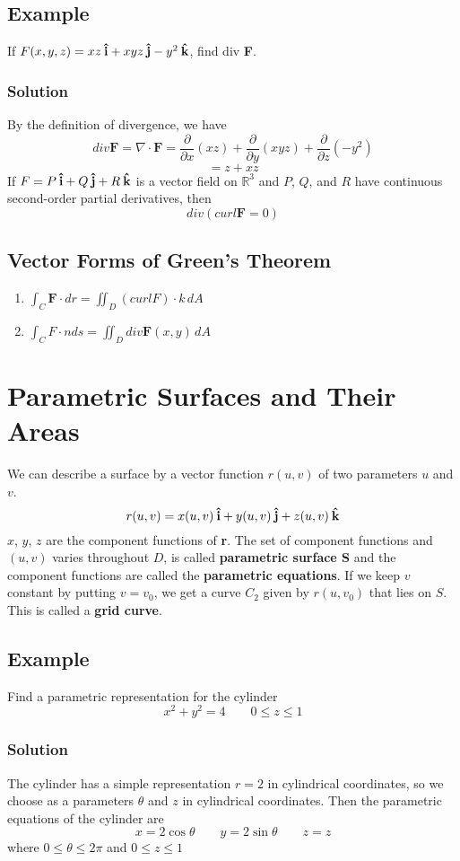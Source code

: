 \subsection*{Example}
If $F(x,y,z) = xz\:\boldsymbol{\hat{\textbf{i}}} + xyz\:\boldsymbol{\hat{\textbf{j}}} - y^2\:\boldsymbol{\hat{\textbf{k}}}$, find div \textbf{F}.
\subsubsection*{Solution} By the definition of divergence, we have 
$$div \textbf{F} = \nabla\cdot\textbf{F} = \frac{\partial}{\partial x}(xz) + \frac{\partial}{\partial y}(xyz) + \frac{\partial}{\partial z}(-y^2)$$
$$= z+ xz$$
If $F = P\:\boldsymbol{\hat{\textbf{i}}} + Q\:\boldsymbol{\hat{\textbf{j}}} + R\:\boldsymbol{\hat{\textbf{k}}}$ is a vector field on $\mathbb{R}^3$ and $P$, $Q$, and $R$ have continuous second-order partial derivatives, then 
$$div (curl\textbf{F} = 0)$$
\subsection{Vector Forms of Green's Theorem}
\begin{enumerate}
    \item $\int_C\textbf{F}\cdot dr = \iint_D(curl F)\cdot k\,dA$
    \item $\int_C F\cdot n ds = \iint_D div \textbf{F}(x,y)\,dA$
\end{enumerate}

\section{Parametric Surfaces and Their Areas}
We can describe a surface by a vector function $r(u,v)$ of two parameters $u$ and $v$. $$r(u,v) = x(u,v)\:\boldsymbol{\hat{\textbf{i}}} + y(u,v)\:\boldsymbol{\hat{\textbf{j}}} + z(u,v)\:\boldsymbol{\hat{\textbf{k}}}$$
$x$, $y$, $z$ are the component functions of \textbf{r}. The set of component functions and $(u,v)$ varies throughout $D$, is called \textbf{parametric surface S} and the component functions are called the \textbf{parametric equations}.
If we keep $v$ constant by putting $v = v_0$, we get a curve $C_2$ given by $r(u, v_0)$ that lies on $S$. This is called a \textbf{grid curve}.
\subsection*{Example}
Find a parametric representation for the cylinder $$x^2 + y^2 = 4\qquad 0\leq z\leq 1$$
\subsubsection*{Solution} The cylinder has a simple representation $r=2$ in cylindrical coordinates, so we choose as a parameters $\theta$ and $z$ in cylindrical coordinates. Then the parametric equations of the cylinder are 
$$x = 2\cos{\theta}\qquad y = 2\sin{\theta}\qquad z = z$$ where $0\leq\theta\leq 2\pi$ and $0\leq z\leq 1$